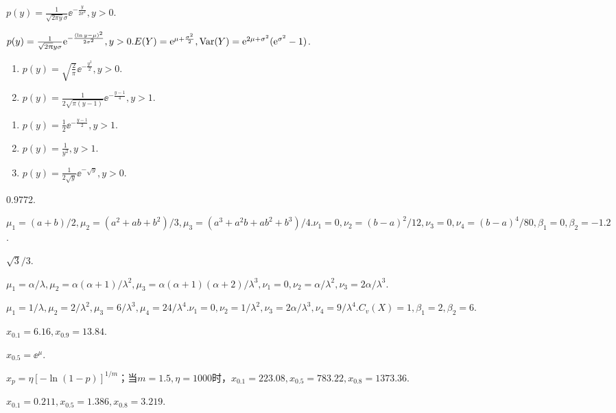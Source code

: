 \begin{answer}
  \item $p(y)=\frac1{\sqrt{2\pi y}\sigma}\ee^{-\frac y{2\sigma^2}},y>0$.
  \item $p(y)=\frac1{\sqrt{2\uppi}y\sigma}\mathrm e^{-
  \frac{(\ln y-\mu)^2}{2\sigma^2}},y>0.E(Y)=\mathrm e^{\mu+\frac{\sigma^2}2},
  \operatorname{Var}(Y)=\mathrm e^{2\mu+\sigma^2}(\mathrm e^{\sigma^2}-1)$.
  \item \begin{enumerate}
    \item $p(y)=\sqrt{\frac2\pi}\ee^{-\frac{y^2}2},y>0$.
    \item $p(y)=\frac1{2\sqrt{\pi(y-1)}}\ee^{-\frac{y-1}4},y>1$.
  \end{enumerate}
  \item \begin{enumerate}
    \item $p(y)=\frac12\ee^{-\frac{y-1}2},y>1$.
    \item $p(y)=\frac1{y^2},y>1$.
    \item $p(y)=\frac1{2\sqrt y}\ee^{-\sqrt y},y>0$.
  \end{enumerate}
  \setcounter{enumi}{17}
  \item 0.9772.
\end{answer}

\begin{answer}
  \item $\mu_1=(a+b)/2,\mu_2=(a^2+ab+b^2)/3,\mu_3=(a^3+a^2b+ab^2+b^3)/4
      .\nu_1=0,\nu_2=(b-a)^2/12,\nu_3=0,\nu_4=(b-a)^4/80,\beta_1
      =0,\beta_2=-1.2$.
  \item $\sqrt3/3$.
  \item $\mu_1=\alpha/\lambda,\mu_2=\alpha(\alpha+1)/\lambda^2,
      \mu_3=\alpha(\alpha+1)(\alpha+2)/\lambda^3,\nu_1=0,\nu_2
      =\alpha/\lambda^2,\nu_3=2\alpha/\lambda^3$.
  \item $\mu_1=1/\lambda,\mu_2=2/\lambda^2,\mu_3
      =6/\lambda^3,\mu_4=24/\lambda^4.\nu_1=0,\nu_2=1/\lambda^2,
      \nu_3=2\alpha/\lambda^3,\nu_4=9/\lambda^4.C_v(X)=1,\beta_1=2,
      \beta_2=6$.
  \item $x_{0.1}=6.16,x_{0.9}=13.84$.
  \item $x_{0.5}=\ee^{\mu}$.
  \item $x_p=\eta[-\ln(1-p)]^{1/m}$；当$m=1.5,\eta=1000$时，$x_{0.1}=
      223.08,x_{0.5}=783.22,x_{0.8}=1373.36$.
  \item $x_{0.1}=0.211,x_{0.5}=1.386,x_{0.8}=3.219$.
\end{answer}

